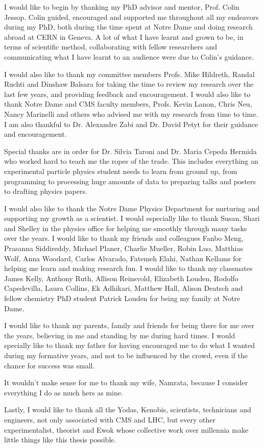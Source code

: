 \documentclass[final,numrefs,sort&compress]{nddiss2e}
\begin{document}
\begin{acknowledge}
  
  I would like to begin by thanking my PhD advisor and mentor, Prof. Colin Jessop. Colin guided, encouraged and supported me throughout all my endeavors during my PhD, both during the time spent at Notre Dame and doing research abroad at CERN in Geneva. A lot of what I have learnt and grown to be, in terms of scientific method, collaborating with fellow researchers and communicating what I have learnt to an audience were due to Colin's guidance.

  I would also like to thank my committee members Profs. Mike Hildreth, Randal Ruchti and Dinshaw Balsara for taking the time to review my research over the last few years, and providing feedback and encouragement. I would also like to thank Notre Dame and CMS faculty members, Profs. Kevin Lanon, Chris Neu, Nancy Marinelli and others who advised me with my research from time to time. I am also thankful to Dr. Alexandre Zabi and Dr. David Petyt for their guidance and encouragement.

  Special thanks are in order for Dr. Silvia Taroni and Dr. Maria Cepeda Hermida who worked hard to teach me the ropes  of the trade. This includes everything an experimental particle physics student needs to learn from ground up, from programming to processing huge amounts of data to preparing talks and posters to drafting physics papers.
  
  I would also like to thank the Notre Dame Physics Department for nurturing and supporting my growth as a scientist. I would especially like to thank Susan, Shari and Shelley in the physics office for helping me smoothly through many tasks over the years. I would like to thank my friends and colleagues Fanbo Meng, Prasanna Siddireddy, Michael Planer, Charlie Mueller, Robin Luo, Matthias Wolf, Anna Woodard, Carlos Alvarado, Fatemeh Elahi, Nathan Kellams for helping me learn and making research fun. I would like to thank my classmates James Kelly, Anthony Ruth, Allison Reinsvold, Elizabeth Louden, Rodolfo Capedevilla, Laura Collins, Ek Adhikari, Matthew Hall, Alison Deatsch and fellow chemistry PhD student Patrick Louden for being my family at Notre Dame.

  I would like to thank my parents, family and friends for being there for me over the years, believing in me and standing by me during hard times. I would specially like to thank my father for having encouraged me to do what I wanted during my formative years, and not to be influenced by the crowd, even if the chance for success was small.

  It wouldn't make sense for me to thank my wife, Namrata, because I consider everything I do as much hers as mine.
  
  Lastly, I would like to thank all the Yodas, Kenobis, scientists, technicians and engineers, not only associated with CMS and LHC, but every other experimentalist, theorist and Ewok whose collective work over millennia make little things like this thesis possible.
  
\end{acknowledge}
\end{document}
